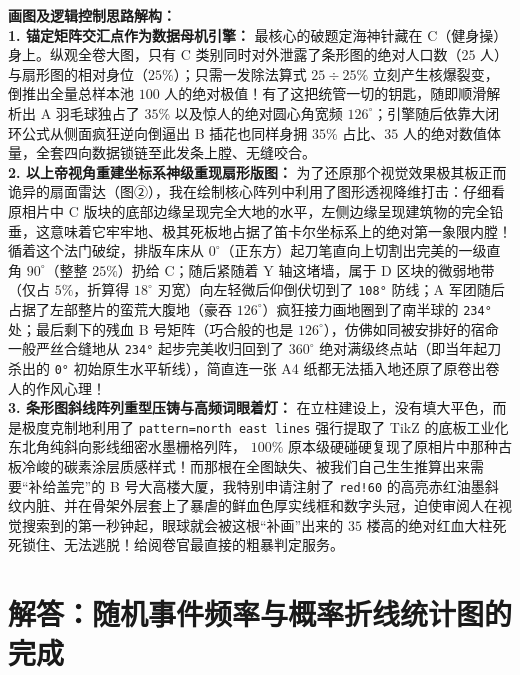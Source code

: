 \vspace{0.4cm}
{\small\color{blue!70!black}
\textbf{画图及逻辑控制思路解构：}\\
\textbf{1. 锚定矩阵交汇点作为数据母机引擎：} 最核心的破题定海神针藏在 C（健身操）身上。纵观全卷大图，只有 C 类别同时对外泄露了条形图的绝对人口数（$25$ 人）与扇形图的相对身位（$25\%$）；只需一发除法算式 $25 \div 25\%$ 立刻产生核爆裂变，倒推出全量总样本池 $100$ 人的绝对极值！有了这把统管一切的钥匙，随即顺滑解析出 A 羽毛球独占了 $35\%$ 以及惊人的绝对圆心角宽频 $126^\circ$；引擎随后依靠大闭环公式从侧面疯狂逆向倒逼出 B 插花也同样身拥 $35\%$ 占比、$35$ 人的绝对数值体量，全套四向数据锁链至此发条上膛、无缝咬合。\\
\textbf{2. 以上帝视角重建坐标系神级重现扇形版图：} 为了还原那个视觉效果极其板正而诡异的扇面雷达（图②），我在绘制核心阵列中利用了图形透视降维打击：仔细看原相片中 C 版块的底部边缘呈现完全大地的水平，左侧边缘呈现建筑物的完全铅垂，这意味着它牢牢地、极其死板地占据了笛卡尔坐标系上的绝对第一象限内膛！\\
循着这个法门破绽，排版车床从 $0^\circ$（正东方）起刀笔直向上切割出完美的一级直角 $90^\circ$（整整 $25\%$）扔给 C；随后紧随着 Y 轴这堵墙，属于 D 区块的微弱地带（仅占 $5\%$，折算得 $18^\circ$ 刃宽）向左轻微后仰倒伏切到了 \texttt{108°} 防线；A 军团随后占据了左部整片的蛮荒大腹地（豪吞 $126^\circ$）疯狂接力画地圈到了南半球的 \texttt{234°} 处；最后剩下的残血 B 号矩阵（巧合般的也是 $126^\circ$），仿佛如同被安排好的宿命一般严丝合缝地从 \texttt{234°} 起步完美收归回到了 $360^\circ$ 绝对满级终点站（即当年起刀杀出的 \texttt{0°} 初始原生水平斩线），简直连一张 A4 纸都无法插入地还原了原卷出卷人的作风心理！\\
\textbf{3. 条形图斜线阵列重型压铸与高频词眼着灯：} 在立柱建设上，没有填大平色，而是极度克制地利用了 \texttt{pattern=north east lines} 强行提取了 TikZ 的底板工业化东北角纯斜向影线细密水墨栅格列阵， $100\%$ 原本级硬碰硬复现了原相片中那种古板冷峻的碳素涂层质感样式！而那根在全图缺失、被我们自己生生推算出来需要“补给盖完”的 B 号大高楼大厦，我特别申请注射了 \texttt{red!60} 的高亮赤红油墨斜纹内脏、并在骨架外层套上了暴虐的鲜血色厚实线框和数字头冠，迫使审阅人在视觉搜索到的第一秒钟起，眼球就会被这根“补画”出来的 $35$ 楼高的绝对红血大柱死死锁住、无法逃脱！给阅卷官最直接的粗暴判定服务。
}

\newpage



\section{解答：随机事件频率与概率折线统计图的完成}

